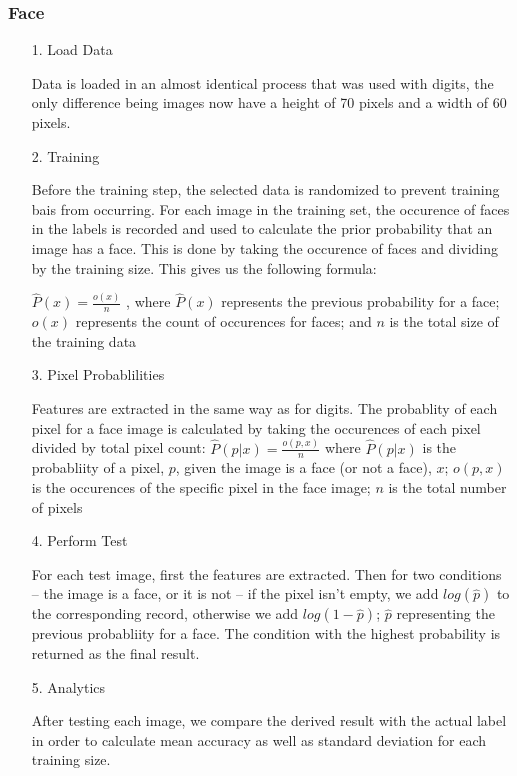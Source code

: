 \documentclass[12pt]{article}
\begin{document}
\subsubsection{Face}
\begin{itemize}
    \item[1.] Load Data
    \item[] Data is loaded in an almost identical process that was used with digits, the only difference being images now have a height of 70 pixels and a width of 60 pixels. 
    \item[2.] Training 
    \item[] Before the training step, the selected data is randomized to prevent training bais from occurring. For each image in the training set, the occurence of faces in the labels is recorded and used to calculate the prior probability that an image has a face. This is done by taking the occurence of faces and dividing by the training size. This gives us the following formula:
    \item[] $\hat{P}(x) = \frac{o(x)}{n}$ , where $\hat{P}(x)$ represents the previous probability for a face; $o(x)$ represents the count of occurences for faces; and $n$ is the total size of the training data
    \item[3.] Pixel Probablilities
    \item[] Features are extracted in the same way as for digits. The probablity of each pixel for a face image is calculated by taking the occurences of each pixel divided by total pixel count: $\hat{P}(p|x) = \frac{o(p, x)}{n}$ where $\hat{P}(p|x)$ is the probabliity of a pixel, $p$, given the image is a face (or not a face), $x$; $o(p, x)$ is the occurences of the specific pixel in the face image; $n$ is the total number of pixels
    \item[4.] Perform Test
    \item[] For each test image, first the features are extracted. Then for two conditions -- the image is a face, or it is not -- if the pixel isn't empty, we add $log(\hat{p})$ to the corresponding record, otherwise we add $log(1 - \hat{p})$; $\hat{p}$ representing the previous probabliity for a face. The condition with the highest probability is returned as the final result.
    \item[5.] Analytics
    \item[] After testing each image, we compare the derived result with the actual label in order to calculate mean accuracy as well as standard deviation for each training size. 
\end{itemize}
\end{document}
